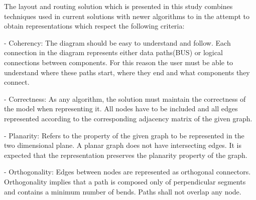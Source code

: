 The layout and routing solution which is presented in this study combines techniques used in current solutions with newer algorithms 
to in the attempt to obtain representations which respect the following criteria:

- Coherency: The diagram should be easy to understand and follow. Each connection in the diagram represents either 
data paths(BUS) or logical connections between components. For this reason the user must be able to understand where these paths start, 
where they end and what components they connect.

- Correctness: As any algorithm, the solution must maintain the correctness of the model when representing it. All nodes have to be
included and all edges represented according to the corresponding adjacency matrix of the given graph.

- Planarity: Refers to the property of the given graph to be represented in the two dimensional plane. A planar graph does not have 
intersecting edges. It is expected that the representation preserves the planarity property of the graph.

- Orthogonality: Edges between nodes are represented as orthogonal connectors. Orthogonality implies that a path is composed only
of perpendicular segments and contains a minimum number of bends. Paths shall not overlap any node.
